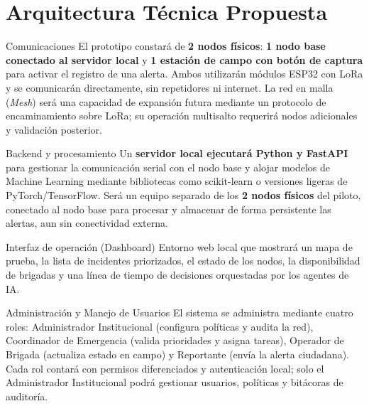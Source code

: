 \documentclass[10pt,letterpaper]{article}
\newcommand{\sectionicon}[1]{\textcolor{cyan}{#1}\enspace}
\begin{document}
\section[Arquitectura Técnica Propuesta]{\sectionicon{\faCogs}Arquitectura Técnica Propuesta}
\vspace{1mm}
\begin{techbox}{\sectionicon{\faWifi}01 \textperiodcentered{} Comunicaciones}
\small\justifying
El prototipo constará de \textbf{2 nodos físicos}: \textbf{1 nodo base conectado al servidor local} y \textbf{1 estación de campo con botón de captura} para activar el registro de una alerta. Ambos utilizarán módulos ESP32 con LoRa y se comunicarán directamente, sin repetidores ni internet. La red en malla (\textit{Mesh}) será una capacidad de expansión futura mediante un protocolo de encaminamiento sobre LoRa; su operación multisalto requerirá nodos adicionales y validación posterior.
\end{techbox}
\begin{techbox}{\sectionicon{\faServer}02 \textperiodcentered{} Backend y procesamiento}
\small\justifying
Un \textbf{servidor local ejecutará Python y FastAPI} para gestionar la comunicación serial con el nodo base y alojar modelos de Machine Learning mediante bibliotecas como scikit-learn o versiones ligeras de PyTorch/TensorFlow. Será un equipo separado de los \textbf{2 nodos físicos} del piloto, conectado al nodo base para procesar y almacenar de forma persistente las alertas, aun sin conectividad externa.
\end{techbox}
\begin{techbox}{\sectionicon{\faDesktop}03 \textperiodcentered{} Interfaz de operación (Dashboard)}
\small\justifying
Entorno web local que mostrará un mapa de prueba, la lista de incidentes priorizados, el estado de los nodos, la disponibilidad de brigadas y una línea de tiempo de decisiones orquestadas por los agentes de IA.
\end{techbox}
\begin{techbox}{\sectionicon{\faUserCog}04 \textperiodcentered{} Administración y Manejo de Usuarios}
\small\justifying
El sistema se administra mediante cuatro roles: Administrador Institucional (configura políticas y audita la red), Coordinador de Emergencia (valida prioridades y asigna tareas), Operador de Brigada (actualiza estado en campo) y Reportante (envía la alerta ciudadana).
Cada rol contará con permisos diferenciados y autenticación local; solo el Administrador Institucional podrá gestionar usuarios, políticas y bitácoras de auditoría.
\end{techbox}
\end{document}
